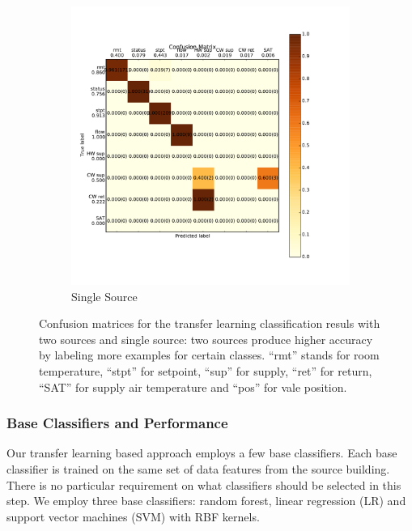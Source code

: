 \begin{figure}[ht!]
\begin{subfigure}{0.48\textwidth}
    \includegraphics[width=\textwidth]{./fig/cm_single}
                \caption{Single Source}
  \end{subfigure}
\caption{Confusion matrices for the transfer learning classification resuls with two sources and single source: two sources produce higher accuracy by labeling more examples for certain classes. ``rmt'' stands for room temperature, ``stpt'' for setpoint, ``sup'' for supply, ``ret'' for return, ``SAT'' for supply air temperature and ``pos'' for vale position.}
\label{fig_cm}
\end{figure}


\subsubsection{Base Classifiers and Performance}
\label{sec:baseline}
Our transfer learning based approach employs a few base classifiers. Each base classifier is trained on the same set of data features from the source building. There is no particular requirement on 
what classifiers should be selected in this step.  
We employ three base classifiers: random forest, linear regression (LR) and support vector machines (SVM) with RBF kernels.


